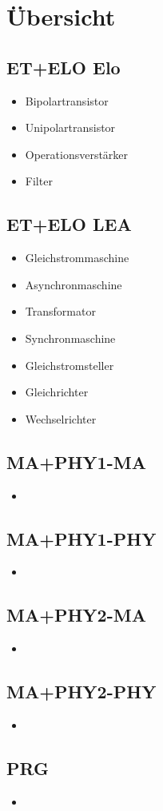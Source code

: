 
\section{Übersicht}

\subsection{ET+ELO Elo}
\begin{itemize}
  \item Bipolartransistor
  \item Unipolartransistor
  \item Operationsverstärker
  \item Filter
\end{itemize}

\subsection{ET+ELO LEA}
\begin{itemize}
  \item Gleichstrommaschine
  \item Asynchronmaschine
  \item Transformator
  \item Synchronmaschine
  \item Gleichstromsteller
  \item Gleichrichter
  \item Wechselrichter
\end{itemize}

\subsection{MA+PHY1-MA}
\begin{itemize}
  \item 
\end{itemize}

\subsection{MA+PHY1-PHY}
\begin{itemize}
  \item 
\end{itemize}

\subsection{MA+PHY2-MA}
\begin{itemize}
  \item 
\end{itemize}

\subsection{MA+PHY2-PHY}
\begin{itemize}
  \item 
\end{itemize}

\subsection{PRG}
\begin{itemize}
  \item 
\end{itemize}

